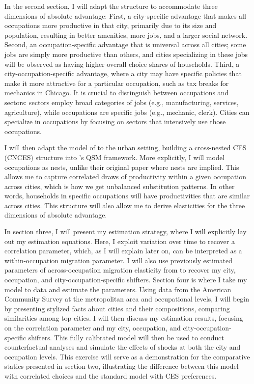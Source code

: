 \documentclass[10pt]{article}
\begin{document}
In the second section, I will adapt the \cite{ek} structure to accommodate three dimensions of absolute advantage: First, a city-specific advantage that makes all occupations more productive in that city, primarily due to its size and population, resulting in better amenities, more jobs, and a larger social network. Second, an occupation-specific advantage that is universal across all cities; some jobs are simply more productive than others, and cities specializing in these jobs will be observed as having higher overall choice shares of households. Third, a city-occupation-specific advantage, where a city may have specific policies that make it more attractive for a particular occupation, such as tax breaks for mechanics in Chicago. It is crucial to distinguish between occupations and sectors: sectors employ broad categories of jobs (e.g., manufacturing, services, agriculture), while occupations are specific jobs (e.g., mechanic, clerk). Cities can specialize in occupations by focusing on sectors that intensively use those occupations.

I will then adapt the model of \cite{lindandramondo} to the urban setting, building a cross-nested CES (CNCES) structure into \cite{redding2017}'s QSM framework. More explicitly, I will model occupations as nests, unlike their original paper where nests are implied. This allows me to capture correlated draws of productivity within a given occupation across cities, which is how we get unbalanced substitution patterns. In other words, households in specific occupations will have productivities that are similar across cities. This structure will also allow me to derive elasticities for the three dimensions of absolute advantage.

In section three, I will present my estimation strategy, where I will explicitly lay out my estimation equations. Here, I exploit variation over time to recover a correlation parameter, which, as I will explain later on, can be interpreted as a within-occupation migration parameter. I will also use previously estimated parameters of across-occupation migration elasticity from \cite{redding} to recover my city, occupation, and city-occupation-specific shifters. Section four is where I take my model to data and estimate the parameters. Using data from the American Community Survey at the metropolitan area and occupational levels, I will begin by presenting stylized facts about cities and their compositions, comparing similarities among top cities. I will then discuss my estimation results, focusing on the correlation parameter and my city, occupation, and city-occupation-specific shifters. This fully calibrated model will then be used to conduct counterfactual analyses and simulate the effects of shocks at both the city and occupation levels. This exercise will serve as a demonstration for the comparative statics presented in section two, illustrating the difference between this model with correlated choices and the standard model with CES preferences.
\end{document}
